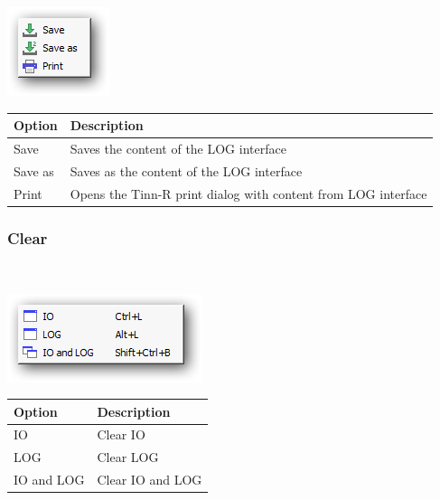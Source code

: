 \includegraphics[scale=0.50]{./res/menu_r_rterm_file_IOandLog.png}\\

\begin{scriptsize}\begin{tabularx}{\textwidth}{>{\hsize=0.3\hsize}X>{\hsize=0.7\hsize}X}\\
    \hline
    \textbf{Option} & \textbf{Description} \\
    \hline
    Save & Saves the content of the LOG interface \\
    Save as & Saves as the content of the LOG interface \\
    Print & Opens the Tinn-R print dialog with content from LOG interface \\
    \hline
  \end{tabularx}\end{scriptsize}


\hypertarget{menu_r_rterm_clear}{}
\subsubsection{Clear}\\

\includegraphics[scale=0.50]{./res/menu_r_rterm_clear.png}\\

\begin{scriptsize}\begin{tabularx}{\textwidth}{>{\hsize=0.3\hsize}X>{\hsize=0.7\hsize}X}\\
    \hline
    \textbf{Option} & \textbf{Description} \\
    \hline
    IO & Clear IO \\
    LOG & Clear LOG \\
    IO and LOG & Clear IO and LOG \\
    \hline
  \end{tabularx}\end{scriptsize}


